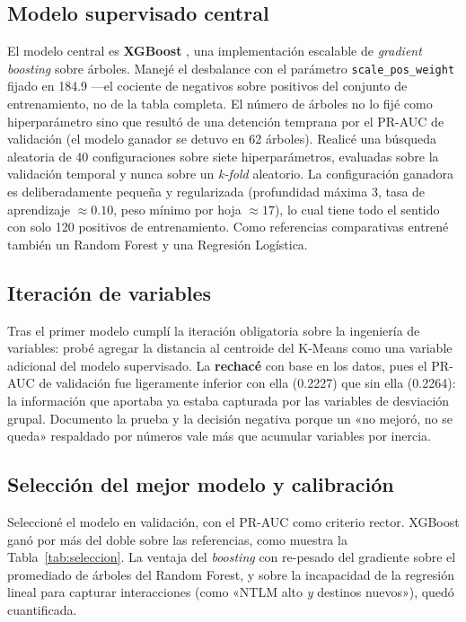 \documentclass[12pt, a4paper]{article}
\begin{document}
\subsection{Modelo supervisado central}

El modelo central es \textbf{XGBoost} \cite{chen2016}, una implementación escalable de
\textit{gradient boosting} sobre árboles. Manejé el desbalance con el parámetro
\texttt{scale\_pos\_weight} fijado en 184.9 ---el cociente de negativos sobre positivos del conjunto
de entrenamiento, no de la tabla completa. El número de árboles no lo fijé como hiperparámetro sino
que resultó de una detención temprana por el PR-AUC de validación (el modelo ganador se detuvo en 62
árboles). Realicé una búsqueda aleatoria de 40 configuraciones sobre siete hiperparámetros, evaluadas
sobre la validación temporal y nunca sobre un \textit{k-fold} aleatorio. La configuración ganadora es
deliberadamente pequeña y regularizada (profundidad máxima 3, tasa de aprendizaje $\approx 0.10$,
peso mínimo por hoja $\approx 17$), lo cual tiene todo el sentido con solo 120 positivos de
entrenamiento. Como referencias comparativas entrené también un Random Forest y una Regresión
Logística.

\subsection{Iteración de variables}

Tras el primer modelo cumplí la iteración obligatoria sobre la ingeniería de variables: probé agregar
la distancia al centroide del K-Means como una variable adicional del modelo supervisado. La
\textbf{rechacé} con base en los datos, pues el PR-AUC de validación fue ligeramente inferior con ella
(0.2227) que sin ella (0.2264): la información que aportaba ya estaba capturada por las variables de
desviación grupal. Documento la prueba y la decisión negativa porque un «no mejoró, no se queda»
respaldado por números vale más que acumular variables por inercia.

\subsection{Selección del mejor modelo y calibración}

Seleccioné el modelo en validación, con el PR-AUC como criterio rector. XGBoost ganó por más del
doble sobre las referencias, como muestra la Tabla~\ref{tab:seleccion}. La ventaja del
\textit{boosting} con re-pesado del gradiente sobre el promediado de árboles del Random Forest, y
sobre la incapacidad de la regresión lineal para capturar interacciones (como «NTLM alto \textit{y}
destinos nuevos»), quedó cuantificada.
\end{document}
